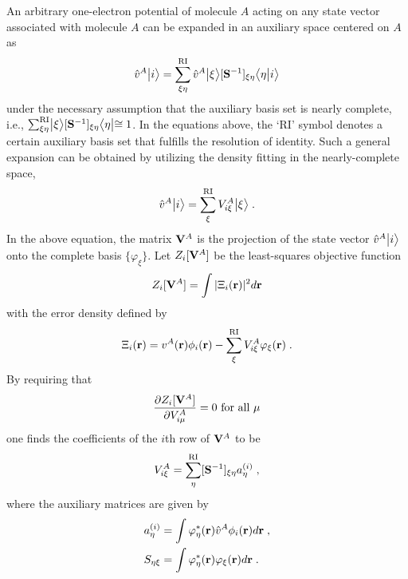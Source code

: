 \documentclass[aip,jcp,amsmath,amssymb,reprint,floatfix]{revtex4-1}
\begin{document}
An arbitrary one\hyp{}electron potential of molecule $A$ acting on any state vector 
associated with molecule $A$ can be expanded in an auxiliary space centered 
on $A$ as
%
\begin{equation}
   \hat{v}^{A}\Ket{i} = \sum_{\xi\eta}^{\rm RI} \hat{v}^{A}\Ket{\xi} [{\bf S}^{-1}]_{\xi\eta} \BraKet{\eta}{i}
\end{equation}
%
under the necessary assumption that the auxiliary basis set is nearly complete,
i.e., 
$\sum_{\xi\eta}^{\rm RI} \Ket{\xi}[{\bf S}^{-1}]_{\xi\eta} \Bra{\eta} \cong 1$.
In the equations above, 
the `RI' symbol denotes a certain auxiliary basis set that fulfills the resolution of identity. 
Such a general expansion can be obtained by 
utilizing the density fitting
in the nearly\hyp{}complete space,
%
\begin{equation} \label{e:v-compl}
 \hat{v}^{A}\Ket{i} = \sum_{\xi}^{\rm RI} V^A_{i\xi} \Ket{\xi} \;.
\end{equation}
%
In the above equation,
the matrix ${\bf V}^A$
is the projection of the state vector $\hat{v}^{A} \Ket{i}$
onto the complete basis $\{ \varphi_\xi \}$.
Let $Z_i[{\bf V}^A]$ be the least\hyp{}squares objective function 
%
\begin{equation} \label{e:z-compl}
 Z_i[{\bf V}^A] = \int \vert \Xi_i({\bf r}) \vert^2 d{\bf r}
\end{equation}
%
with the error density defined by
%
\begin{equation} \label{e:error-compl}
 \Xi_i({\bf r}) = v^A({\bf r}) \phi_i({\bf r}) - \sum_\xi^{\rm RI} V^A_{i\xi} \varphi_\xi({\bf r}) \;.
\end{equation}
%
By requiring that
%
\begin{equation} \label{e:z-necessary-requirement}
 \frac{\partial Z_i[{\bf V}^A]}{\partial V^A_{i\mu}} = 0 \text{ for all $\mu$}
\end{equation}
%
one finds the coefficients of the $i$th row of ${\bf V}^A$ to be
%
\begin{equation} \label{e:gdf-compl.v}
  V^A_{i\xi} = \sum_\eta^{\rm RI} [{\bf S}^{-1}]_{\xi\eta} a^{(i)}_\eta \;,
\end{equation}
%
where the auxiliary matrices are given by
%
\begin{subequations}
\begin{align}
 a^{(i)}_\eta &= \int \varphi^*_\eta({\bf r}) \hat{v}^A \phi_i({\bf r}) d{\bf r} \;,\\  
 S_{\eta\xi}  &= \int \varphi^*_\eta({\bf r}) \varphi_\xi({\bf r}) d{\bf r} \;.
\end{align}
\end{subequations}
\end{document}
